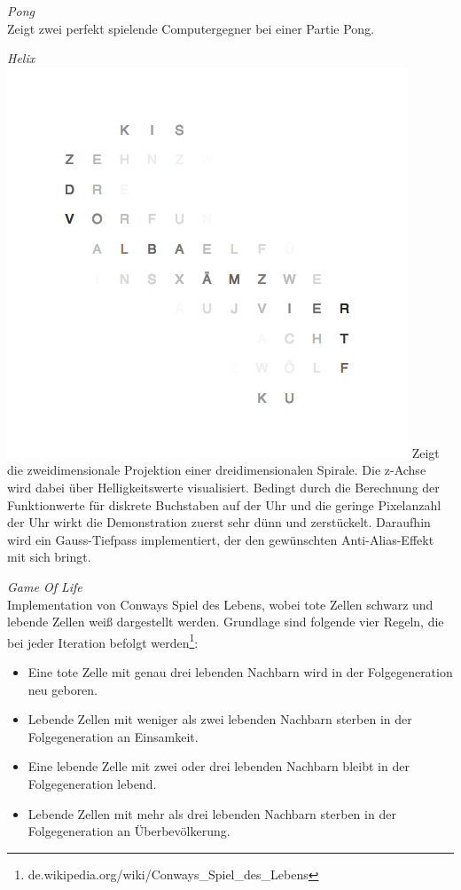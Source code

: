 \begin{multicols}{2}
\emph{Pong} \\
Zeigt zwei perfekt spielende Computergegner bei einer Partie Pong.

\emph{Helix} \\
\includegraphics[width=\columnwidth]{Abbildungen/Software/Demo/Helix}
Zeigt die zweidimensionale Projektion einer dreidimensionalen Spirale. Die z-Achse wird dabei über Helligkeitswerte visualisiert.
Bedingt durch die Berechnung der Funktionwerte für diskrete Buchstaben auf der Uhr und die geringe Pixelanzahl der Uhr wirkt die Demonstration zuerst sehr dünn und zerstückelt.
Daraufhin wird ein Gauss-Tiefpass implementiert, der den gewünschten Anti-Alias-Effekt mit sich bringt.

\emph{Game Of Life} \\
Implementation von Conways Spiel des Lebens, wobei tote Zellen schwarz und lebende Zellen weiß dargestellt werden.
Grundlage sind folgende vier Regeln, die bei jeder Iteration befolgt werden\footnote{de.wikipedia.org/wiki/Conways\_Spiel\_des\_Lebens}:
\begin{itemize}
    \item Eine tote Zelle mit genau drei lebenden Nachbarn wird in der Folgegeneration neu geboren.
    \item Lebende Zellen mit weniger als zwei lebenden Nachbarn sterben in der Folgegeneration an Einsamkeit.
    \item Eine lebende Zelle mit zwei oder drei lebenden Nachbarn bleibt in der Folgegeneration lebend.
    \item Lebende Zellen mit mehr als drei lebenden Nachbarn sterben in der Folgegeneration an Überbevölkerung.
\end{itemize}


\end{multicols}
